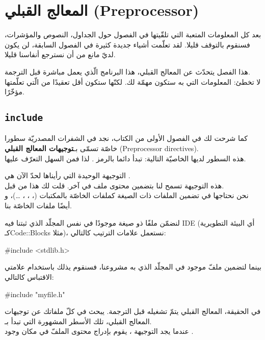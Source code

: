 \chapter{المعالج القبلي (\textenglish{Preprocessor})}

بعد كل المعلومات المتعبة التي تلقّيتها في الفصول حول الجداول، النصوص والمؤشرات، فسنقوم بالتوقف قليلا. لقد تعلّمت أشياء جديدة كثيرة في الفصول السابقة، لن يكون لديّ مانع من أن نسترجع أنفاسنا قليلا.

هذا الفصل يتحدّث عن المعالج القبلي، هذا البرنامج الّذي يعمل مباشرة قبل الترجمة.\\
لا تخطئ: المعلومات التي به ستكون مهمّة لك. لكنّها ستكون أقل تعقيدًا من الّتي تعلّمتها مؤخّرًا.

\section{\texttt{include}}

كما شرحت لك  في الفصول الأولى من الكتاب، نجد في الشفرات المصدريّة سطورا خاصّة تسمّى بـ\textbf{توجيهات المعالج القبلي} (\textenglish{Preprocessor directives}).\\
هذه السطور لديها الخاصيّة التالية: تبدأ دائما بالرمز
\InlineCode{\#}.
لذا فمن السهل التعرّف عليها.

التوجيهة الوحيدة التي رأيناها لحدّ الآن هي
.\\
هذه التوجيهة تسمح لنا بتضمين محتوى ملف في آخر. قلت لك هذا من قبل.\\
نحن نحتاجها في تضمين الملفات ذات الصيغة
كملفات
الخاصّة بالمكتبات
(، ، ، \dots)،
و أيضًا ملفات
الخاصّة بنا.

لنضمّن ملفًا ذو صيغة
موجودًا في نفس المجلّد الذي ثبتنا فيه \textenglish{IDE}
(أي البيئة التطويرية كـ\textenglish{Code::Blocks}
مثلا)، نستعمل علامات الترتيب
\InlineCode{< >}
كالتالي:

\begin{Csource}
#include <stdlib.h>
\end{Csource}

بينما لتضمين ملفّ
موجود في المجلّد الذي به مشروعنا، فسنقوم يذلك باستخدام علامتي الاقتباس كالتالي:

\begin{Csource}
#include "myfile.h"
\end{Csource}

في الحقيقة، المعالج القبلي يتمّ تشغيله قبل الترجمة. يبحث في كلّ ملفاتك عن توجيهات المعالج القبلي، تلك الأسطر المشهورة التي تبدأ بـ\InlineCode{\#}.\\
عندما يجد التوجيهة
،
يقوم بإدراج محتوى الملفّ في مكان وجود
.


